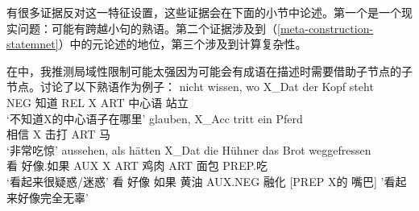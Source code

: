 有很多证据反对这一特征设置，这些证据会在下面的小节中论述。第一个是一个现实问题：可能有跨越小句的熟语。第二个证据涉及到（\ref{meta-construction-statemnet}）中的元论述的地位，第三个涉及到计算复杂性。


在中，我推测局域性限制可能太强因为可能会有成语在描述时需要借助子节点的子节点。讨论了以下熟语作为例子：
\eal
\label{ex-idiom-non-nominative-external}
\ex 
\gll nicht wissen, wo    X\_Dat der Kopf steht\\
     NEG   知道    REL X     ART 中心语 站立\\
\glt `不知道X的中心语子在哪里'
\ex\label{mich-tritt-ein-Pferd}
\gll glauben, X\_Acc tritt ein Pferd\\
     相信  X     击打 ART 马\\
\glt `非常吃惊'
\ex 
\gll aussehen, als hätten X\_Dat die Hühner das Brot weggefressen\\
	 看 好像.如果 AUX X ART 鸡肉 ART 面包 PREP.吃\\
\glt `看起来很疑惑/迷惑'
\ex
\label{ex-look-as-if-butter}
看 好像 如果 黄油 AUX.NEG 融化 [PREP X的 嘴巴]
\glt '看起来好像完全无辜'
